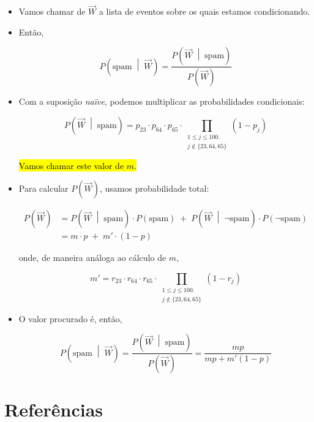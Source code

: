 \documentclass[
  11pt]{report}
\begin{document}
\begin{itemize}
\item
  Vamos chamar de $\vec W$ a lista de eventos sobre os quais estamos condicionando.
\item
  Então,

  \[
  P\left( \text{spam} \;\middle|\; \vec W \right) = 
  \frac{P\left(\vec W \;\middle|\; \text{spam} \right)}
  {P\left( \vec W  \right)}
  \]
\item
  Com a suposição \emph{naïve}, podemos multiplicar as probabilidades condicionais:

  \[
  P\left(\vec W\;\middle|\; \text{spam} \right) =
  p_{23} \cdot p_{64} \cdot p_{65} \cdot
  \!\!\!\!\!\!\!\!\!
  \prod_{
    \begin{array}{c}
    1 \leq j \leq 100. \\
    j \not\in \{ 23, 64, 65 \}
    \end{array}
  }
  \!\!\!\!\!\!\!
  (1 - p_j)
  \]

  {\hl{Vamos chamar este valor de $m$.}}
\item
  Para calcular $P\left( \vec W \right)$, usamos probabilidade total:

  \[
  \begin{aligned}
  P\left( \vec W \right) 
  &= 
    P\left(\vec W \;\middle|\; \text{spam} \right) 
    \cdot P(\text{spam})
    \;+\;
    P\left(\vec W \;\middle|\; \neg\text{spam} \right) 
    \cdot P(\neg\text{spam})
  \\
  &=
    m \cdot p \;+\; m' \cdot (1 - p)
  \end{aligned}
  \]

  onde, de maneira análoga ao cálculo de $m$,

  \[
  m' = 
    r_{23} \cdot r_{64} \cdot r_{65} \cdot
  \!\!\!\!\!\!\!\!\!
  \prod_{
    \begin{array}{c}
    1 \leq j \leq 100. \\
    j \not\in \{ 23, 64, 65 \}
    \end{array}
  }
  \!\!\!\!\!\!\!
  (1 - r_j)
  \]
\item
  O valor procurado é, então,

  \[
  P\left( \text{spam} \;\middle|\; \vec W \right) 
  = 
  \frac{P\left(\vec W \;\middle|\; \text{spam} \right)}
  {P\left( \vec W  \right)}
  = \frac{mp}{mp + m'(1 - p)}
  \]
\end{itemize}

\hypertarget{referuxeancias}{%
\chapter*{Referências}\label{referuxeancias}}
\end{document}
